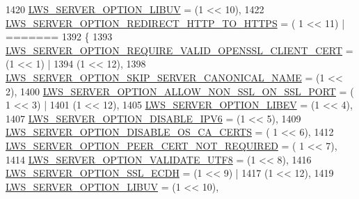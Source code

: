 \begin{DoxyCode}
1420         \hyperlink{group__context-and-vhost_gga41c2d763f78cc248df3b9f8645dbd2a5aff121db04a10cf8b2c5df9d4f2b89f1e}{LWS\_SERVER\_OPTION\_LIBUV}                                  = (1 << 10),
1422         \hyperlink{group__context-and-vhost_gga41c2d763f78cc248df3b9f8645dbd2a5a4832187186c4d130c68051214cd42ada}{LWS\_SERVER\_OPTION\_REDIRECT\_HTTP\_TO\_HTTPS}                = (
      1 << 11) |
=======
1392                          \{
1393         \hyperlink{group__context-and-vhost_gga41c2d763f78cc248df3b9f8645dbd2a5a274ed462a1a9239eb6ddf9007f5b7092}{LWS\_SERVER\_OPTION\_REQUIRE\_VALID\_OPENSSL\_CLIENT\_CERT}  
      = (1 << 1) |
1394                                                                   (1 << 12),
1398         \hyperlink{group__context-and-vhost_gga41c2d763f78cc248df3b9f8645dbd2a5a6582c985ee0ceaadc1d277030eae2d7c}{LWS\_SERVER\_OPTION\_SKIP\_SERVER\_CANONICAL\_NAME}                
      = (1 << 2),
1400         \hyperlink{group__context-and-vhost_gga41c2d763f78cc248df3b9f8645dbd2a5a1cc4562d05cba52a6dfa0697a65ade0d}{LWS\_SERVER\_OPTION\_ALLOW\_NON\_SSL\_ON\_SSL\_PORT}          = (
      1 << 3) |
1401                                                                   (1 << 12),
1405         \hyperlink{group__context-and-vhost_gga41c2d763f78cc248df3b9f8645dbd2a5a273d9975675130de0c6dc937dde7c8a6}{LWS\_SERVER\_OPTION\_LIBEV}                                  = (1 << 4),
1407         \hyperlink{group__context-and-vhost_gga41c2d763f78cc248df3b9f8645dbd2a5a34ab36e68c0d593b6f19b8d5ef1240a9}{LWS\_SERVER\_OPTION\_DISABLE\_IPV6}                            = (1 << 5),
1409         \hyperlink{group__context-and-vhost_gga41c2d763f78cc248df3b9f8645dbd2a5a4933347a821e73c3f1e13fb6bfc7ad93}{LWS\_SERVER\_OPTION\_DISABLE\_OS\_CA\_CERTS}                      = (
      1 << 6),
1412         \hyperlink{group__context-and-vhost_gga41c2d763f78cc248df3b9f8645dbd2a5ac56a8a6590e74a8016d0fae09fb404fc}{LWS\_SERVER\_OPTION\_PEER\_CERT\_NOT\_REQUIRED}                = (
      1 << 7),
1414         \hyperlink{group__context-and-vhost_gga41c2d763f78cc248df3b9f8645dbd2a5aa0158b4e85420811e6b0f1378c6ded0f}{LWS\_SERVER\_OPTION\_VALIDATE\_UTF8}                          = (1 << 8),
1416         \hyperlink{group__context-and-vhost_gga41c2d763f78cc248df3b9f8645dbd2a5a1b2f8bde0f62adc7ebe81b2043f34c0c}{LWS\_SERVER\_OPTION\_SSL\_ECDH}                            = (1 << 9) |
1417                                                                   (1 << 12),
1419         \hyperlink{group__context-and-vhost_gga41c2d763f78cc248df3b9f8645dbd2a5aff121db04a10cf8b2c5df9d4f2b89f1e}{LWS\_SERVER\_OPTION\_LIBUV}                                  = (1 << 10),

\end{DoxyCode}
